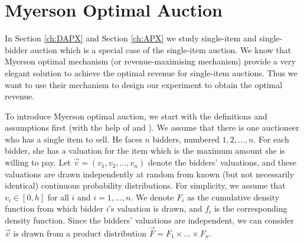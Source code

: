  
\section{Myerson Optimal Auction}
In Section \ref{ch:DAPX} and Section \ref{ch:APX} we study single-item and single-bidder auction which is a special case of the single-item auction. We know that Myerson optimal mechanism \cite{myerson1981optimal}
(or revenue-maximising mechanism) provide a very elegant solution to achieve the optimal revenue for single-item auctions. Thus we want to use their mechanism to design our experiment to obtain the optimal revenue.

To introduce Myerson optimal auction, we start with the definitions and  assumptions first (with the help of \cite{myerson1981optimal} and \cite[p.~335--338]{nisan_roughgarden_tardos_vazirani_2007}). We assume that there is one auctioneer who has a single item to sell. He faces $n$ bidders, numbered $1,2,...,n$. For each bidder, she has a valuation for the item which is the maximum amount she is willing to pay. Let $\vec{v} = (v_1, v_2,...,v_n)$ denote the bidders' valuations, and these valuations are drawn independently at random from known (but not necessarily identical) continuous probability distributions. For simplicity, we assume that $v_i \in [0,h]$ for all $i$ and $i = 1,.. .,n$. We denote $F_i$ as the cumulative density function from which bidder $i$'s valuation is drawn, and $f_i$ is the corresponding density function. Since the bidders' valuations are independent, we can consider $\vec{v}$ is drawn from a product distribution $\vec{F} = F_1 \times ...\times F_n$. \\

